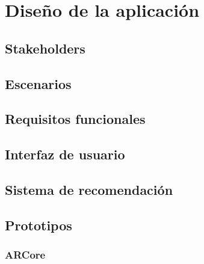 
\cleardoublepage


\chapter{Diseño de la aplicación}
\label{makereference3}

\section{Stakeholders}
\label{makereference3.1}

\section{Escenarios}
\label{makereference3.2}

\section{Requisitos funcionales}
\label{makereference3.3}

\section{Interfaz de usuario}
\label{makereference3.4}

\section{Sistema de recomendación}
\label{makereference3.5}

\section{Prototipos}
\label{makereference3.6}

\subsection{ARCore} 
\label{makereference3.6.1} 
 
